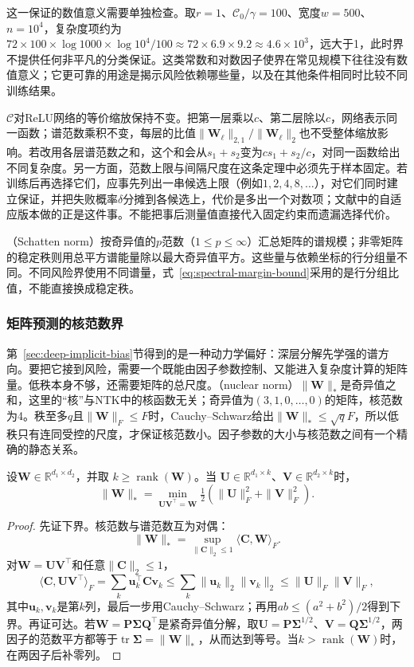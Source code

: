 这一保证的数值意义需要单独检查。取$r=1$、$\mathcal C_0/\gamma=100$、宽度$w=500$、$n=10^4$，复杂度项约为$72\times100\times\log1000\times\log10^4/100\approx72\times6.9\times9.2\approx4.6\times10^3$，远大于1，此时界不提供任何非平凡的分类保证。这类常数和对数因子使界在常见规模下往往没有数值意义；它更可靠的用途是揭示风险依赖哪些量，以及在其他条件相同时比较不同训练结果。

$\mathcal C$对ReLU网络的等价缩放保持不变。把第一层乘以$c$、第二层除以$c$，网络表示同一函数；谱范数乘积不变，每层的比值$\|\bm W_\ell\|_{2,1}/\|\bm W_\ell\|_2$也不受整体缩放影响。若改用各层谱范数之和，这个和会从$s_1+s_2$变为$cs_1+s_2/c$，对同一函数给出不同复杂度。另一方面，范数上限与间隔尺度在这条定理中必须先于样本固定。若训练后再选择它们，应事先列出一串候选上限（例如$1,2,4,8,\ldots$），对它们同时建立保证，并把失败概率$\delta$分摊到各候选上，代价是多出一个对数项；文献中的自适应版本做的正是这件事。不能把事后测量值直接代入固定约束而遗漏选择代价。

（Schatten norm）按奇异值的$p$范数（$1\leq p\leq\infty$）汇总矩阵的谱规模；非零矩阵的稳定秩则用总平方谱能量除以最大奇异值平方。这些量与依赖坐标的行分组量不同。不同风险界使用不同谱量，式~\eqref{eq:spectral-margin-bound}采用的是行分组比值，不能直接换成稳定秩。

\subsubsection{矩阵预测的核范数界}

第~\ref{sec:deep-implicit-bias}节得到的是一种动力学偏好：深层分解先学强的谱方向。要把它接到风险，需要一个既能由因子参数控制、又能进入复杂度计算的矩阵量。低秩本身不够，还需要矩阵的总尺度。（nuclear norm）$\|\bm W\|_*$是奇异值之和，这里的“核”与NTK中的核函数无关；奇异值为$(3,1,0,\ldots,0)$的矩阵，核范数为4。秩至多$q$且$\|\bm W\|_F\leq F$时，Cauchy--Schwarz给出$\|\bm W\|_*\leq\sqrt qF$，所以低秩只有连同受控的尺度，才保证核范数小。因子参数的大小与核范数之间有一个精确的静态关系。

\begin{lemma}[二层分解的范数关系]
\label{lem:factorization-nuclear-norm}
设$\bm W\in\mathbb R^{d_1\times d_2}$，并取
$k\geq\operatorname{rank}(\bm W)$。当
$\bm U\in\mathbb R^{d_1\times k}$、$\bm V\in\mathbb R^{d_2\times k}$时，
\[
 \|\bm W\|_*=\min_{\bm U\bm V^\top=\bm W}
       \tfrac12(\|\bm U\|_F^2+\|\bm V\|_F^2).
\]
\end{lemma}
\begin{proof}
先证下界。核范数与谱范数互为对偶：
\[
 \|\bm W\|_*=\sup_{\|\bm C\|_2\leq1}\langle\bm C,\bm W\rangle_F.
\]
对$\bm W=\bm U\bm V^\top$和任意$\|\bm C\|_2\leq1$，
\[
 \langle\bm C,\bm U\bm V^\top\rangle_F=\sum_k\bm u_k^\top\bm C\bm v_k\leq\sum_k\|\bm u_k\|_2\|\bm v_k\|_2\leq\|\bm U\|_F\|\bm V\|_F,
\]
其中$\bm u_k,\bm v_k$是第$k$列，最后一步用Cauchy--Schwarz；再用$ab\leq(a^2+b^2)/2$得到下界。再证可达。若$\bm W=\bm P\bm\Sigma\bm Q^\top$是紧奇异值分解，取$\bm U=\bm P\bm\Sigma^{1/2}$、$\bm V=\bm Q\bm\Sigma^{1/2}$，两因子的范数平方都等于$\operatorname{tr}\bm\Sigma=\|\bm W\|_*$，从而达到等号。当$k>\operatorname{rank}(\bm W)$时，在两因子后补零列。
\end{proof}

